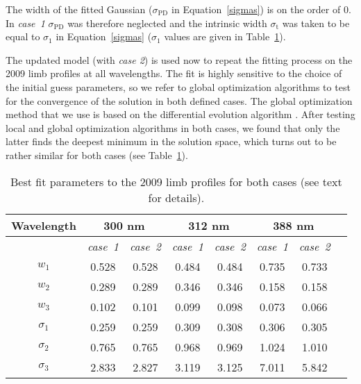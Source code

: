 \documentclass[goettingen, gauss, print]{thesis}
\begin{document}
The width of the fitted Gaussian ($\sigma_{\mathrm{PD}}$ in Equation~\ref{sigmas}) is on the order of 0. In \textit{case~1} $\sigma_{\mathrm{PD}}$ was therefore neglected  and the intrinsic width $\sigma_{\mathrm{t}}$ was taken to be equal to $\sigma_{1}$ in Equation~\ref{sigmas} ($\sigma_{1}$ values are given in Table~\ref{cases_1_2}).
 
The updated model (with \textit{case 2}) is used now to repeat the fitting process on the 2009 limb profiles at all wavelengths. The fit is highly sensitive to the choice of the initial guess parameters, so we refer to global optimization algorithms to test for the convergence of the solution in both defined cases. The global optimization method that we use is based on the differential evolution algorithm \citep{storn_differential_1997}. After testing local and global optimization algorithms in both cases, we found that only the latter finds the deepest minimum in the solution space, which turns out to be rather similar for both cases (see Table~\ref{cases_1_2}).

\begin{table}
\caption{Best fit parameters to the 2009 limb profiles for both cases (see text for details). }
\label{cases_1_2}
\centering
\begin{tabular}{cccccccc}

\hline
\hline
Wavelength  & \multicolumn{2}{c}{300 nm}  & \multicolumn{2}{c}{312 nm}  & \multicolumn{2}{c}{388 nm}  \\
\hline
\hline
& \textit{case~1}& \textit{case~2} & \textit{case~1}&\textit{case~2}&\textit{case~1}&\textit{case~2}\\
\hline
\hline
$w_1$ & 0.528&0.528& 0.484&0.484& 0.735 & 0.733 \\
$w_2$&  0.289&0.289&0.346 & 0.346 & 0.158 & 0.158 \\
$w_3$& 0.102&0.101&  0.099& 0.098 & 0.073 & 0.066 \\
$\sigma_1$& 0.259&0.259 &0.309&0.308&  0.306&0.305\\
$\sigma_2$&0.765&0.765&0.968&0.969&1.024&1.010  \\
$\sigma_3$&2.833&2.827 &3.119&3.125 &7.011&5.842\\
 
\hline

\end{tabular}
\end{table}
\end{document}
